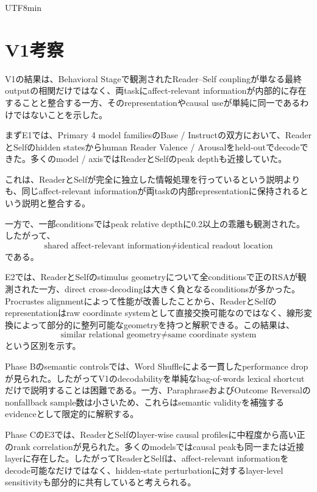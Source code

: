 \documentclass{article} %
\begin{document}
\begin{CJK*}{UTF8}{min}



\section{V1考察}
\label{sec:v1-discussion}

V1の結果は、Behavioral Stageで観測されたReader--Self couplingが単なる最終outputの相関だけではなく、両taskにaffect-relevant informationが内部的に存在することと整合する一方、そのrepresentationやcausal useが単純に同一であるわけではないことを示した。

まずE1では、Primary 4 model familiesのBase / Instructの双方において、ReaderとSelfのhidden statesからhuman Reader Valence / Arousalをheld-outでdecodeできた。多くのmodel / axisではReaderとSelfのpeak depthも近接していた。

これは、ReaderとSelfが完全に独立した情報処理を行っているという説明よりも、同じaffect-relevant informationが両taskの内部representationに保持されるという説明と整合する。

一方で、一部conditionsではpeak relative depthに0.2以上の乖離も観測された。したがって、
\[
\text{shared affect-relevant information}
\neq
\text{identical readout location}
\]
である。

E2では、ReaderとSelfのstimulus geometryについて全conditionsで正のRSAが観測された一方、direct cross-decodingは大きく負となるconditionsが多かった。Procrustes alignmentによって性能が改善したことから、ReaderとSelfのrepresentationはraw coordinate systemとして直接交換可能なのではなく、線形変換によって部分的に整列可能なgeometryを持つと解釈できる。この結果は、
\[
\text{similar relational geometry}
\neq
\text{same coordinate system}
\]
という区別を示す。

Phase Bのsemantic controlsでは、Word Shuffleによる一貫したperformance dropが見られた。したがってV1のdecodabilityを単純なbag-of-words lexical shortcutだけで説明することは困難である。一方、ParaphraseおよびOutcome Reversalのnonfallback sample数は小さいため、これらはsemantic validityを補強するevidenceとして限定的に解釈する。

Phase CのE3では、ReaderとSelfのlayer-wise causal profilesに中程度から高い正のrank correlationが見られた。多くのmodelsではcausal peakも同一または近接layerに存在した。したがってReaderとSelfは、affect-relevant informationをdecode可能なだけではなく、hidden-state perturbationに対するlayer-level sensitivityも部分的に共有していると考えられる。


\end{CJK*}
\end{document}
